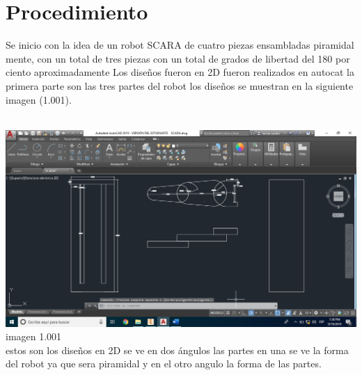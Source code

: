\documentclass[10pt,a4paper]{article}
\begin{document}
\section{{\Huge Procedimiento}}
{\Large Se inicio con la idea de un robot SCARA de cuatro piezas ensambladas piramidal mente, con un total de tres piezas con un total de grados de libertad del 180 por ciento aproximadamente Los diseños fueron en 2D fueron realizados en autocat la primera parte son las tres partes del robot los diseños se muestran en la siguiente imagen (1.001).}\\ \\
\begin{center}
\includegraphics[scale=0.25]{Imagenes/2D.png} imagen 1.001  
\\{estos son los diseños en 2D se ve en dos ángulos las partes en una se ve la forma del robot ya que sera piramidal y en el otro angulo la forma de las partes.} \\ 
\end{center}
\end{document}
